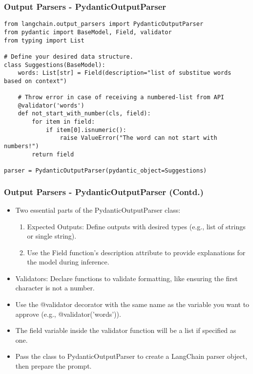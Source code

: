 \begin{frame}[fragile]
\frametitle{Output Parsers - PydanticOutputParser}

\begin{lstlisting}
from langchain.output_parsers import PydanticOutputParser
from pydantic import BaseModel, Field, validator
from typing import List

# Define your desired data structure.
class Suggestions(BaseModel):
    words: List[str] = Field(description="list of substitue words based on context")

    # Throw error in case of receiving a numbered-list from API
    @validator('words')
    def not_start_with_number(cls, field):
        for item in field:
            if item[0].isnumeric():
                raise ValueError("The word can not start with numbers!")
        return field

parser = PydanticOutputParser(pydantic_object=Suggestions)	
\end{lstlisting}

\end{frame}

\begin{frame}[fragile]
\frametitle{Output Parsers - PydanticOutputParser (Contd.)}

\begin{itemize}
    \item Two essential parts of the PydanticOutputParser class:
    \begin{enumerate}
        \item Expected Outputs: Define outputs with desired types (e.g., list of strings or single string).
        \item Use the Field function's description attribute to provide explanations for the model during inference.
    \end{enumerate}
    \item Validators: Declare functions to validate formatting, like ensuring the first character is not a number.
    \item Use the @validator decorator with the same name as the variable you want to approve (e.g., @validator('words')).
    \item The field variable inside the validator function will be a list if specified as one.
    \item Pass the class to PydanticOutputParser to create a LangChain parser object, then prepare the prompt.
\end{itemize}

\end{frame}

